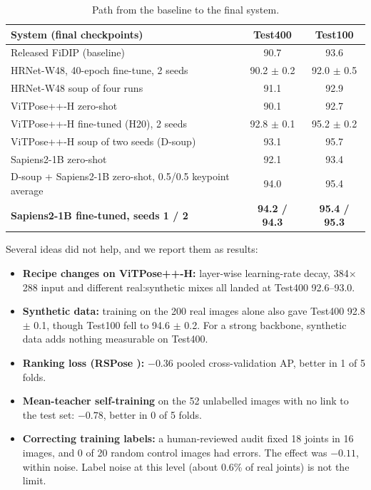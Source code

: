 \documentclass[11pt]{article}
\begin{document}
\begin{table}[h]
\centering\small
\begin{tabular}{@{}lcc@{}}
\toprule
System (final checkpoints) & Test400 & Test100 \\
\midrule
Released FiDIP (baseline) & 90.7 & 93.6 \\
HRNet-W48, 40-epoch fine-tune, 2 seeds & 90.2 $\pm$ 0.2 & 92.0 $\pm$ 0.5 \\
HRNet-W48 soup of four runs & 91.1 & 92.9 \\
ViTPose++-H zero-shot & 90.1 & 92.7 \\
ViTPose++-H fine-tuned (H20), 2 seeds & 92.8 $\pm$ 0.1 & 95.2 $\pm$ 0.2 \\
ViTPose++-H soup of two seeds (D-soup) & 93.1 & 95.7 \\
Sapiens2-1B zero-shot & 92.1 & 93.4 \\
D-soup + Sapiens2-1B zero-shot, 0.5/0.5 keypoint average & 94.0 & 95.4 \\
\textbf{Sapiens2-1B fine-tuned, seeds 1 / 2} & \textbf{94.2 / 94.3} & \textbf{95.4 / 95.3} \\
\bottomrule
\end{tabular}
\caption{Path from the baseline to the final system.}
\label{tab:path}
\end{table}

Several ideas did not help, and we report them as results:
\begin{itemize}
  \item \textbf{Recipe changes on ViTPose++-H:} layer-wise learning-rate decay, 384$\times$288 input and different real:synthetic mixes all landed at Test400 92.6--93.0.
  \item \textbf{Synthetic data:} training on the 200 real images alone also gave Test400 92.8 $\pm$ 0.1, though Test100 fell to 94.6 $\pm$ 0.2. For a strong backbone, synthetic data adds nothing measurable on Test400.
  \item \textbf{Ranking loss (RSPose \cite{rspose}):} $-0.36$ pooled cross-validation AP, better in 1 of 5 folds.
  \item \textbf{Mean-teacher self-training} \cite{meanteacher} on the 52 unlabelled images with no link to the test set: $-0.78$, better in 0 of 5 folds.
  \item \textbf{Correcting training labels:} a human-reviewed audit fixed 18 joints in 16 images, and 0 of 20 random control images had errors. The effect was $-0.11$, within noise. Label noise at this level (about 0.6\% of real joints) is not the limit.
\end{itemize}
\end{document}
